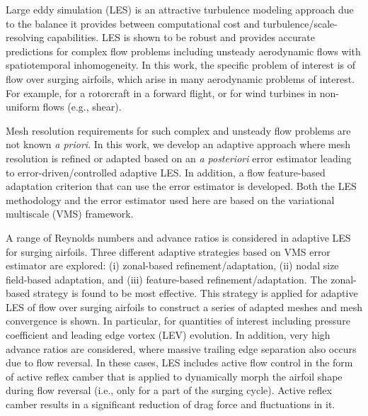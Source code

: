  
 
Large eddy simulation (LES) is an attractive turbulence modeling approach due to the balance it provides between computational cost and turbulence/scale-resolving capabilities. 
LES is shown to be robust and provides accurate predictions for complex flow problems including unsteady aerodynamic flows with spatiotemporal inhomogeneity.
In this work, the specific problem of interest is of flow over surging airfoils, which arise in many aerodynamic problems of interest. For example, for a rotorcraft in a forward flight, or for wind turbines in non-uniform flows (e.g., shear).

Mesh resolution requirements for such complex and unsteady flow problems are not known \textit{a priori}.
In this work, we develop an adaptive approach where mesh resolution is refined or adapted based on an \textit{a posteriori} error estimator leading to error-driven/controlled adaptive LES.
In addition, a flow feature-based adaptation criterion that can use the error estimator is developed.
Both the LES methodology and the error estimator used here are based on the variational multiscale (VMS) framework.

A range of Reynolds numbers and advance ratios is considered in adaptive LES for surging airfoils.
Three different adaptive strategies based on VMS error estimator are explored: (i) zonal-based refinement/adaptation, (ii) nodal size field-based adaptation, and (iii) feature-based refinement/adaptation.
The zonal-based strategy is found to be most effective. This strategy is applied for adaptive LES of flow over surging airfoils to construct a series of adapted meshes and mesh convergence is shown. In particular, for quantities of interest including pressure coefficient and leading edge vortex (LEV) evolution.
In addition, very high advance ratios are considered, where massive trailing edge separation also occurs due to flow reversal. In these cases, LES includes active flow control in the form of active reflex camber that is applied to dynamically morph the airfoil shape during flow reversal (i.e., only for a part of the surging cycle). Active reflex camber results in a significant reduction of drag force and fluctuations in it.






